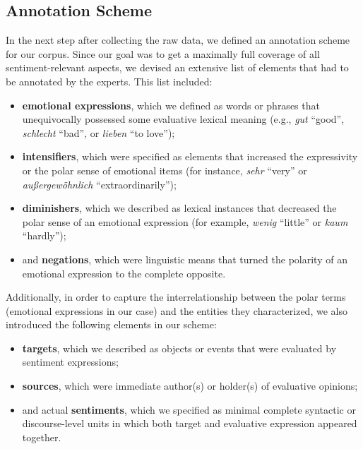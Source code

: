 \subsection{Annotation Scheme}\label{subsec:snt:ascheme}
In the next step after collecting the raw data, we defined an
annotation scheme for our corpus. Since our goal was to get a
maximally full coverage of all sentiment-relevant aspects, we devised
an extensive list of elements that had to be annotated by the experts.
This list included:
\begin{itemize}
  \item\textbf{emotional expressions}, which we defined as words or
    phrases that unequivocally possessed some evaluative lexical
    meaning (e.g., \emph{gut} ``good'', \emph{schlecht} ``bad'', or
    \emph{lieben} ``to love'');
  \item\textbf{intensifiers}, which were specified as elements that
    increased the expressivity or the polar sense of emotional items
    (for instance, \emph{sehr} ``very'' or
    \emph{au\ss{}ergew\"ohnlich} ``extraordinarily'');
  \item\textbf{diminishers}, which we described as lexical instances
    that decreased the polar sense of an emotional expression (for
    example, \emph{wenig} ``little'' or \emph{kaum} ``hardly'');
  \item and \textbf{negations}, which were linguistic means that
    turned the polarity of an emotional expression to the complete
    opposite.
\end{itemize}

Additionally, in order to capture the interrelationship between the
polar terms (emotional expressions in our case) and the entities they
characterized, we also introduced the following elements in our
scheme:
\begin{itemize}
  \item\textbf{targets}, which we described as objects or events that
    were evaluated by sentiment expressions;
  \item\textbf{sources}, which were immediate author(s) or holder(s)
    of evaluative opinions;
  \item and actual \textbf{sentiments}, which we specified as minimal
    complete syntactic or discourse-level units in which both target
    and evaluative expression appeared together.
\end{itemize}

